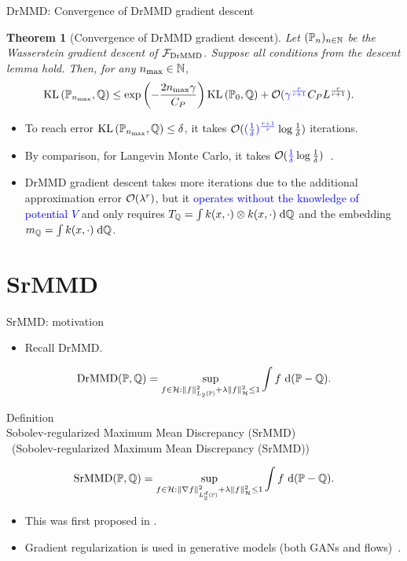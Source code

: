 \documentclass[aspectratio=169,xcolor=dvipsnames]{beamer}
\newtheorem{thm}{Theorem}
\newtheorem{defi}{Definition}
\renewenvironment{defi}[1][]{%
  \begin{alertblock}{Definition\ifx\\#1\\\else~(#1)\fi}%
}{%
  \end{alertblock}%
}
\let\oldcitep\citep
\renewcommand{\citep}[1]{{\scriptsize\textcolor{graytext}{\oldcitep{#1}}}}
\newcommand{\blue}[1]{\textcolor{blue}{#1}}
\begin{document}
\begin{frame}{DrMMD: Convergence of DrMMD gradient descent}
\begin{thm}[Convergence of DrMMD gradient descent]
Let $(\mathbb{P}_n)_{n\in\mathbb{N}}$ be the Wasserstein gradient descent of $\mathcal{F}_{\mathrm{DrMMD}}$. Suppose all conditions from the descent lemma hold. Then, for any $n_{\max}\in\mathbb{N}$,
\begin{align*}
    \kl\left(\Pb_{n_{\max}}, \Qb\right) & \leq \exp \left(-\frac{ 2 n_{\max } \gamma}{C_P}\right) \kl\left(\Pb_0, \Qb\right) + \calO( \blue{\gamma^{\frac{r}{r+1}}} C_P L^{\frac{r}{r+1}} ).
\end{align*}
\end{thm}
\begin{itemize}
    \item To reach error $\mathrm{KL}\left(\mathbb{P}_{n_{\max}}, \mathbb{Q}\right)\leq \delta$, it takes $\mathcal{O}(\blue{(\frac{1}{\delta})^{\frac{r+1}{r}}} \log \frac{1}{\delta})$ iterations.
    \item By comparison, for Langevin Monte Carlo, it takes $\mathcal{O}(\blue{\frac{1}{\delta}} \log \frac{1}{\delta})$~\citep{chewi2024analysis}.
    \item DrMMD gradient descent takes more iterations due to the additional approximation error $\mathcal{O}(\lambda^r)$, but it \blue{operates without the knowledge of potential $V$} and only requires $T_{\mathbb{Q}}=\int k(x,\cdot) \otimes k(x,\cdot) \; \mathrm{d} \mathbb{Q}$ and the embedding $m_{\mathbb{Q}} = \int k(x,\cdot) \; \mathrm{d} \mathbb{Q}$.
\end{itemize}
\end{frame}

\section{SrMMD}
\begin{frame}{SrMMD: motivation}
    \begin{itemize}
        \item Recall DrMMD.
    \end{itemize}
    \begin{align*}
        \operatorname{DrMMD}(\mathbb{P}, \mathbb{Q})=\sup _{f \in \mathcal{H}:\|f\|_{L_2(\mathbb{P})}^2+\lambda\|f\|_{\mathcal{H}}^2 \leq 1} \int f \mathrm{~d}(\mathbb{P}-\mathbb{Q}) .
    \end{align*}
    \begin{defi}[Sobolev-regularized Maximum Mean Discrepancy (SrMMD)]
    \begin{align*}
        \operatorname{SrMMD}(\mathbb{P}, \mathbb{Q})=\sup _{f \in \mathcal{H}:\|\nabla f\|_{L_2^d(\mathbb{P})}^2+\lambda\|f\|_{\mathcal{H}}^2 \leq 1} \int f \mathrm{~d}(\mathbb{P}-\mathbb{Q}) .
    \end{align*}
    \end{defi}
    \begin{itemize}
        \item This was first proposed in \citep{mroueh2019sobolev}. 
        \item Gradient regularization is used in generative models (both GANs and flows)~\citep{galashov2024deep,arbel2018gradient,gulrajani2017improved,finlay2020train,tao2026strain}. 
    \end{itemize}
\end{frame}
\end{document}
